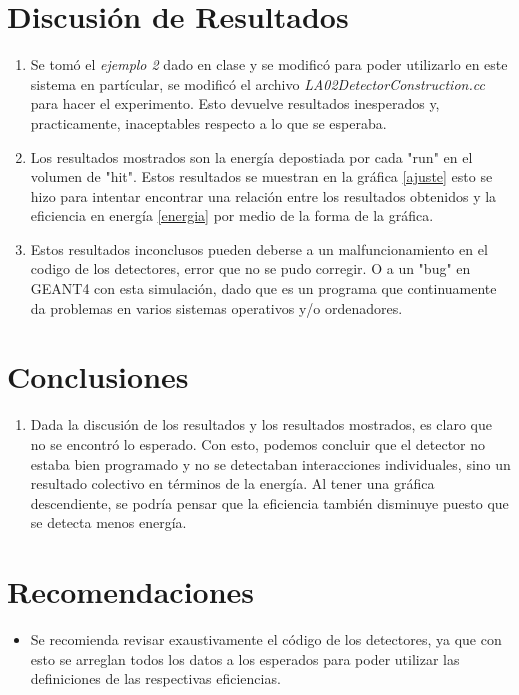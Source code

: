 \documentclass[conference]{IEEEtran}
\begin{document}
\section{Discusión de Resultados}
\begin{enumerate}
    \item Se tomó el \textit{ejemplo 2} dado en clase y se modificó para poder utilizarlo en este sistema en partícular, se modificó el archivo \textit{LA02DetectorConstruction.cc} para hacer el experimento. Esto devuelve resultados inesperados y, practicamente, inaceptables respecto a lo que se esperaba.
    \item Los resultados mostrados son la energía depostiada por cada "run" en el volumen de "hit". Estos resultados se muestran en la gráfica \ref{ajuste} esto se hizo para intentar encontrar una relación entre los resultados obtenidos y la eficiencia en energía \eqref{energia} por medio de la forma de la gráfica.
    \item Estos resultados inconclusos pueden deberse a un malfuncionamiento en el codigo de los detectores, error que no se pudo corregir. O a un "bug" en GEANT4 con esta simulación, dado que es un programa que continuamente da problemas en varios sistemas operativos y/o ordenadores.
\end{enumerate}



\section{Conclusiones}
\begin{enumerate}
    \item Dada la discusión de los resultados y los resultados mostrados, es claro que no se encontró lo esperado. Con esto, podemos concluir que el detector no estaba bien programado y no se detectaban interacciones individuales, sino un resultado colectivo en términos de la energía. Al tener una gráfica descendiente, se podría pensar que la eficiencia también disminuye puesto que se detecta menos energía.
\end{enumerate}






\section{Recomendaciones}
\begin{itemize}
	\item Se recomienda revisar exaustivamente el código de los detectores, ya que con esto se arreglan todos los datos a los esperados para poder utilizar las definiciones de las respectivas eficiencias.
\end{itemize}
\end{document}
